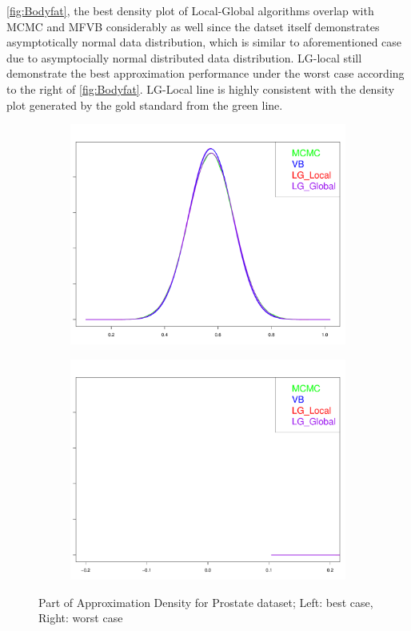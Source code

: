 \autoref{fig:Bodyfat}, the best density plot of Local-Global algorithms overlap with MCMC and MFVB considerably as well since the datset itself demonstrates asymptotically normal data distribution, which is similar to aforementioned case due to asymptocially normal distributed data distribution. LG-local still demonstrate the best approximation performance under the worst case according to the right of \autoref{fig:Bodyfat}. LG-Local line is highly consistent with the density plot generated by the gold standard from the green line.\\
\begin{figure}[h]
	\begin{subfigure}{0.5\textwidth}
		\centering
		\includegraphics[page = 1, width=\linewidth,keepaspectratio]{lasso_densities_prostate.pdf}
	\end{subfigure}
	\begin{subfigure}{0.5\textwidth}
		\includegraphics[page = 7, width=\linewidth,keepaspectratio]{lasso_densities_prostate-1.pdf}
	\end{subfigure}
	\caption{Part of Approximation Density for Prostate dataset; Left: best case, Right: worst case}
	\label{fig:Prostate}
\end{figure}
